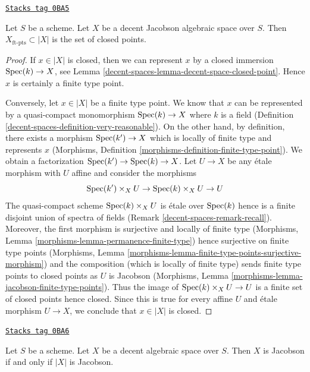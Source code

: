 \begin{lemma}
\label{decent-spaces-lemma-decent-Jacobson-ft-pts}
\href{https://stacks.math.columbia.edu/tag/0BA5}{\texttt{Stacks tag 0BA5}}

Let $S$ be a scheme. Let $X$ be a decent Jacobson algebraic space over $S$.
Then $X_{\text{ft-pts}} \subset |X|$ is the set of closed points.
\end{lemma}

\begin{proof}
If $x \in |X|$ is closed, then we can represent $x$ by a closed
immersion $\operatorname{Spec}(k) \to X$, see Lemma \ref{decent-spaces-lemma-decent-space-closed-point}.
Hence $x$ is certainly a finite type point.

\medskip\noindent
Conversely, let $x \in |X|$ be a finite type point. We know that
$x$ can be represented by a quasi-compact monomorphism
$\operatorname{Spec}(k) \to X$ where $k$ is a field
(Definition \ref{decent-spaces-definition-very-reasonable}). On the other hand,
by definition, there exists a morphism $\operatorname{Spec}(k') \to X$
which is locally of finite type and represents $x$
(Morphisms, Definition \ref{morphisms-definition-finite-type-point}).
We obtain a factorization $\operatorname{Spec}(k') \to \operatorname{Spec}(k) \to X$.
Let $U \to X$ be any \'etale morphism with $U$ affine and consider
the morphisms
$$
\operatorname{Spec}(k') \times_X U \to \operatorname{Spec}(k) \times_X U \to U
$$
The quasi-compact scheme $\operatorname{Spec}(k) \times_X U$ is \'etale over
$\operatorname{Spec}(k)$ hence is a finite disjoint union
of spectra of fields (Remark \ref{decent-spaces-remark-recall}).
Moreover, the first morphism is surjective and locally of finite type
(Morphisms, Lemma \ref{morphisms-lemma-permanence-finite-type})
hence surjective on finite type points
(Morphisms, Lemma \ref{morphisms-lemma-finite-type-points-surjective-morphism})
and the composition (which is locally of finite type) sends
finite type points to closed points as $U$ is Jacobson
(Morphisms, Lemma \ref{morphisms-lemma-jacobson-finite-type-points}).
Thus the image of
$\operatorname{Spec}(k) \times_X U \to U$ is a finite set of closed points hence
closed. Since this is true for every affine $U$ and \'etale morphism
$U \to X$, we conclude that $x \in |X|$ is closed.
\end{proof}

\begin{lemma}
\label{decent-spaces-lemma-decent-Jacobson}
\href{https://stacks.math.columbia.edu/tag/0BA6}{\texttt{Stacks tag 0BA6}}

Let $S$ be a scheme. Let $X$ be a decent algebraic space over $S$.
Then $X$ is Jacobson if and only if $|X|$ is Jacobson.
\end{lemma}

